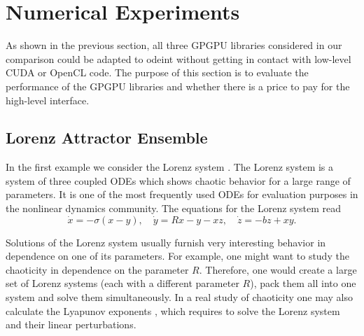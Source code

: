 \documentclass[final]{siamltex}
\begin{document}
%
%
\section{Numerical Experiments}

As shown in the previous section, all three GP\-GPU libraries considered
in our comparison could be adapted to odeint without getting in
contact with low-level CUDA or OpenCL code.  The purpose of this
section is to evaluate the performance of the GPGPU libraries and
whether there is a price to pay for the high-level interface.






%
%

\subsection{Lorenz Attractor Ensemble}

In the first example we consider the Lorenz system \cite{Lorenz-63}. The
Lorenz system is a system of three coupled ODEs which shows chaotic
behavior for a large range of parameters. It is one of the most frequently
used ODEs for evaluation purposes in the nonlinear dynamics community.   %
The equations for the Lorenz system read
\begin{equation}
    \dot{x} = -\sigma \left( x - y \right), \quad
    \dot{y} = R x - y - xz, \quad
    \dot{z} = -bz + xy.
    \label{eq:lorenz}
\end{equation}

Solutions of the Lorenz system usually furnish very interesting
behavior in dependence on one of its parameters.  For example, one
might want to study the chaoticity in dependence on the parameter
$R$. Therefore, one would create a large set of Lorenz systems (each
with a different parameter $R$), pack them all into one system and
solve them simultaneously. In a real study of chaoticity one
may also calculate the Lyapunov exponents \cite{Ott-book-02}, which
requires to solve the Lorenz system and their linear perturbations.

\end{document}
